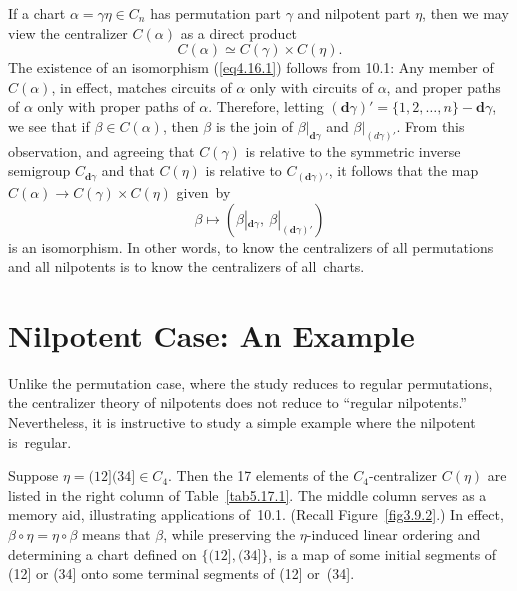 \documentclass{surv-l}
\numberwithin{equation}{section}
\numberwithin{table}{section}
\numberwithin{figure}{section}
\theoremstyle{definition}
\begin{document}
If a chart $\alpha=\gamma\eta\in C_{n}$ has permutation part
$\gamma$ and nilpotent part $\eta$, then we may view the
centralizer $C(\alpha)$ as a direct product
\begin{equation}\label{eq4.16.1}
C(\alpha)\simeq C(\gamma)\times C(\eta).
\end{equation}
The existence of an isomorphism (\ref{eq4.16.1}) follows from
10.1: Any member of $C(\alpha)$, in effect, matches circuits of
$\alpha$ only with circuits of $\alpha$, and proper paths of
$\alpha$ only with proper paths of $\alpha$. Therefore, letting
$(\mathbf{d}\gamma)'=\{1,2,\ldots, n\}- \mathbf{d}\gamma$, we see
that if $\beta\in C(\alpha)$, then $\beta$ is the join of
$\beta|_{\mathbf{d}\gamma}$ and $\beta|_{(d\gamma)'}$. From this
observation, and agreeing that $C(\gamma)$ is relative to the
symmetric inverse semigroup $C_{\mathbf{d}\gamma}$ and that
$C(\eta)$ is relative to $C_{(\mathbf{d}\gamma)'}$, it follows
that the map $C(\alpha)\rightarrow C(\gamma)\times C(\eta)$
given~by
\[
\beta\mapsto(\beta|_{\mathbf{d}\gamma},\ \beta|_{(\mathbf{d}\gamma)'})
\]
is an isomorphism. In other words, to know the centralizers of all
permutations and all nilpotents is to know the centralizers of
all~charts.

\setcounter{section}{16}
\section{Nilpotent Case: An Example}\label{sec5.17}

Unlike the permutation case, where the study reduces to regular
permutations, the centralizer theory of nilpotents does not reduce
to ``regular nilpotents.'' Nevertheless, it is instructive to
study a simple example where the nilpotent is~regular.

Suppose $\eta=(12](34]\in C_{4}$. Then the 17 elements of the
$C_{4}$-centralizer $C(\eta)$ are listed in the right column of
Table~\ref{tab5.17.1}. The middle column serves as a memory aid,
illustrating applications of~10.1. (Recall Figure~\ref{fig3.9.2}.)
In effect, $\beta \circ\eta=\eta \circ\beta$ means that $\beta$, while
preserving the $\eta$-induced linear ordering and determining a
chart defined on $\{(12],(34]\}$, is a map of some initial
segments of (12] or (34] onto some terminal segments of (12]
or~(34].
\end{document}
